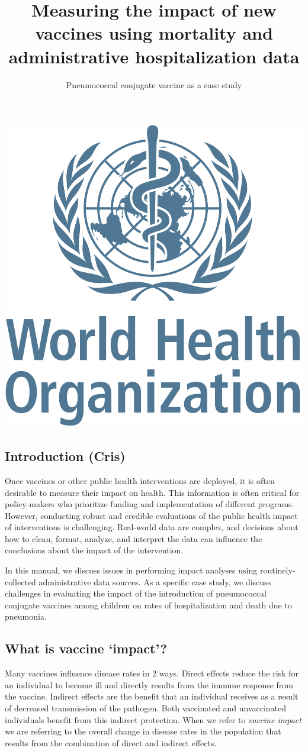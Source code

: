 \documentclass[]{article}
\title{Measuring the impact of new vaccines using mortality and administrative
hospitalization data}
\subtitle{Pneumococcal conjugate vaccine as a case study}
\author{}
\date{}
\begin{document}
\maketitle

{
\setcounter{tocdepth}{3}
\tableofcontents
}
\begin{center}\includegraphics[width=0.328\linewidth]{WHO_logo} \end{center}

\subsection{Introduction (Cris)}\label{introduction-cris}

Once vaccines or other public health interventions are deployed, it is
often desirable to measure their impact on health. This information is
often critical for policy-makers who prioritize funding and
implementation of different programs. However, conducting robust and
credible evaluations of the public health impact of interventions is
challenging. Real-world data are complex, and decisions about how to
clean, format, analyze, and interpret the data can influence the
conclusions about the impact of the intervention.

In this manual, we discuss issues in performing impact analyses using
routinely-collected administrative data sources. As a specific case
study, we discuss challenges in evaluating the impact of the
introduction of pneumococcal conjugate vaccines among children on rates
of hospitalization and death due to pneumonia.

\subsection{\texorpdfstring{What is vaccine
`impact'?}{What is vaccine impact?}}\label{what-is-vaccine-impact}

Many vaccines influence disease rates in 2 ways. Direct effects reduce
the risk for an individual to become ill and directly results from the
immune response from the vaccine. Indirect effects are the benefit that
an individual receives as a result of decreased transmission of the
pathogen. Both vaccinated and unvaccinated individuals benefit from this
indirect protection. When we refer to \emph{vaccine impact} we are
referring to the overall change in disease rates in the population that
results from the combination of direct and indirect effects.
\end{document}
